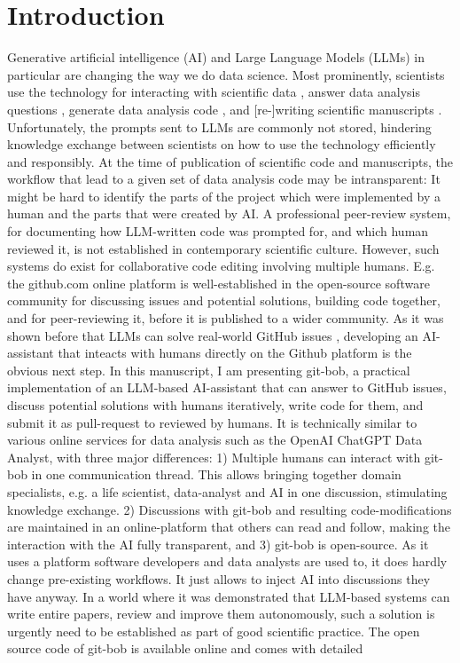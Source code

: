 \documentclass{ecai}
\begin{document}

\section{Introduction}

Generative artificial intelligence (AI) and Large Language Models (LLMs) in particular are changing the way we do data science. Most prominently, scientists use the technology for interacting with scientific data \citep{Royer2023}, answer data analysis questions \citep{Lai2022DS1000, lei2024bioimage}, generate data analysis code \citep{royer2023omega, benchmark_llm_bia, chen2021evaluating}, and [re-]writing scientific manuscripts \citep{lu2024aiscientist}. Unfortunately, the prompts sent to LLMs are commonly not stored, hindering knowledge exchange between scientists on how to use the technology efficiently and responsibly. At the time of publication of scientific code and manuscripts, the workflow that lead to a given set of data analysis code may be intransparent: It might be hard to identify the parts of the project which were implemented by a human and the parts that were created by AI. A professional peer-review system, for documenting how LLM-written code was prompted for, and which human reviewed it, is not established in contemporary scientific culture. However, such systems do exist for collaborative code editing involving multiple humans. E.g. the github.com online platform is well-established in the open-source software community for discussing issues and potential solutions, building code together, and for peer-reviewing it, before it is published to a wider community. As it was shown before that LLMs can solve real-world GitHub issues \citep{jimenez2024swebenchlanguagemodelsresolve}, developing an AI-assistant that inteacts with humans directly on the Github platform is the obvious next step. In this manuscript, I am presenting git-bob, a practical implementation of an LLM-based AI-assistant that can answer to GitHub issues, discuss potential solutions with humans iteratively, write code for them, and submit it as pull-request to reviewed by humans. It is technically similar to various online services for data analysis such as the OpenAI ChatGPT Data Analyst, with three major differences: 1) Multiple humans can interact with git-bob in one communication thread. This allows bringing together domain specialists, e.g. a life scientist, data-analyst and AI in one discussion, stimulating knowledge exchange. 2) Discussions with git-bob and resulting code-modifications are maintained in an online-platform that others can read and follow, making the interaction with the AI fully transparent, and 3) git-bob is open-source. As it uses a platform software developers and data analysts are used to, it does hardly change pre-existing workflows. It just allows to inject AI into discussions they have anyway. In a world where it was demonstrated that LLM-based systems can write entire papers, review and improve them \citep{lu2024aiscientist} autonomously, such a solution is urgently need to be established as part of good scientific practice. The open source code of git-bob is available online and comes with detailed 
\end{document}
